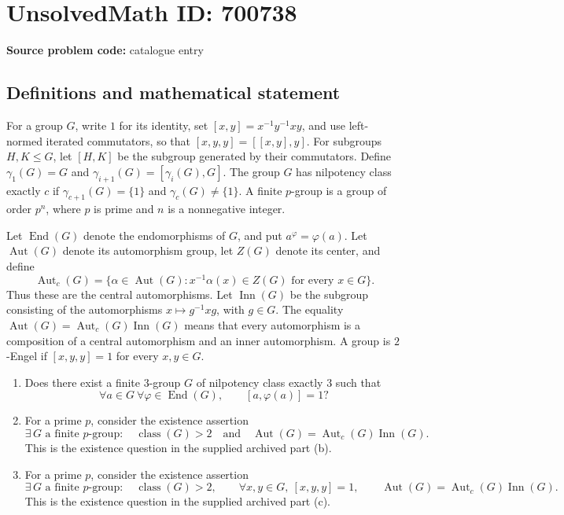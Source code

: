 \documentclass[11pt]{article}
\begin{document}
\section*{UnsolvedMath ID: 700738}
\textbf{Source problem code:} catalogue entry
\subsection{Definitions and mathematical statement}
For a group \(G\), write \(1\) for its identity, set \([x,y]=x^{-1}y^{-1}xy\), and use left-normed iterated commutators, so that \([x,y,y]=[[x,y],y]\). For subgroups \(H,K\leq G\), let \([H,K]\) be the subgroup generated by their commutators. Define \(\gamma_1(G)=G\) and \(\gamma_{i+1}(G)=[\gamma_i(G),G]\). The group \(G\) has nilpotency class exactly \(c\) if \(\gamma_{c+1}(G)=\{1\}\) and \(\gamma_c(G)\neq\{1\}\). A finite \(p\)-group is a group of order \(p^n\), where \(p\) is prime and \(n\) is a nonnegative integer.

Let \(\operatorname{End}(G)\) denote the endomorphisms of \(G\), and put \(a^\varphi=\varphi(a)\). Let \(\operatorname{Aut}(G)\) denote its automorphism group, let \(Z(G)\) denote its center, and define
\[
\operatorname{Aut}_c(G)=\{\alpha\in\operatorname{Aut}(G):x^{-1}\alpha(x)\in Z(G)\text{ for every }x\in G\}.
\]
Thus these are the central automorphisms. Let \(\operatorname{Inn}(G)\) be the subgroup consisting of the automorphisms \(x\mapsto g^{-1}xg\), with \(g\in G\). The equality \(\operatorname{Aut}(G)=\operatorname{Aut}_c(G)\operatorname{Inn}(G)\) means that every automorphism is a composition of a central automorphism and an inner automorphism. A group is \(2\)-Engel if \([x,y,y]=1\) for every \(x,y\in G\).

\begin{enumerate}
\item[(a)] Does there exist a finite \(3\)-group \(G\) of nilpotency class exactly \(3\) such that
\[
\forall a\in G\ \forall\varphi\in\operatorname{End}(G),\qquad [a,\varphi(a)]=1?
\]
\item[(b)] For a prime \(p\), consider the existence assertion
\[
\exists\,G\text{ a finite }p\text{-group}:\quad
\operatorname{class}(G)>2
\quad\text{and}\quad
\operatorname{Aut}(G)=\operatorname{Aut}_c(G)\operatorname{Inn}(G).
\]
This is the existence question in the supplied archived part (b).
\item[(c)] For a prime \(p\), consider the existence assertion
\[
\exists\,G\text{ a finite }p\text{-group}:\quad
\operatorname{class}(G)>2,\qquad
\forall x,y\in G,\ [x,y,y]=1,
\qquad
\operatorname{Aut}(G)=\operatorname{Aut}_c(G)\operatorname{Inn}(G).
\]
This is the existence question in the supplied archived part (c).
\end{enumerate}
\end{document}
